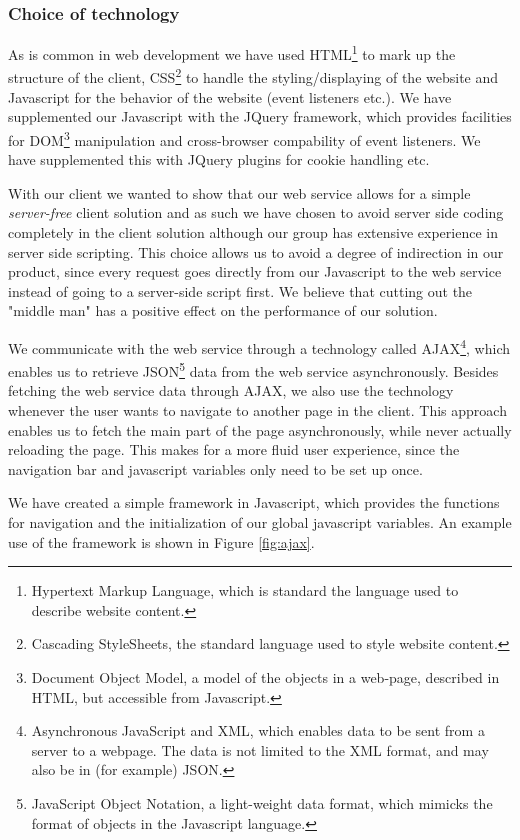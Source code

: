 \subsubsection{Choice of technology}

As is common in web development we have used HTML\footnote{Hypertext Markup Language,
which is standard the language used to describe website content.} to mark up the
structure of the client, CSS\footnote{Cascading StyleSheets, the standard language
used to style website content.} to handle the styling/displaying of the website and
Javascript for the behavior of the website (event listeners etc.). We have supplemented
our Javascript with the JQuery framework, which provides facilities for
DOM\footnote{Document Object Model, a model of the objects in a web-page, described in
HTML, but accessible from Javascript.} manipulation and cross-browser compability of
event listeners. We have supplemented this with JQuery plugins for cookie handling etc.

With our client we wanted to show that our web service allows for a simple \emph{server-free}
client solution and as such we have chosen to avoid server side coding completely in the
client solution although our group has extensive experience in server side scripting. This
choice allows us to avoid a degree of indirection in our product, since every request goes
directly from our Javascript to the web service instead of going to a server-side script
first. We believe that cutting out the "middle man" has a positive effect on the performance
of our solution.

We communicate with the web service through a technology called AJAX\footnote{Asynchronous
JavaScript and XML, which enables data to be sent from a server to a webpage. The data is
not limited to the XML format, and may also be in (for example) JSON.}, which enables us to
retrieve JSON\footnote{JavaScript Object Notation, a light-weight data format, which mimicks
the format of objects in the Javascript language.} data from the web service asynchronously.
Besides fetching the web service data through AJAX, we also use the technology whenever the
user wants to navigate to another page in the client. This approach enables us to fetch the
main part of the page asynchronously, while never actually reloading the page. This makes
for a more fluid user experience, since the navigation bar and javascript variables only
need to be set up once.

We have created a simple framework in Javascript, which provides the functions for navigation and the initialization of our global javascript variables. An example use of the framework is shown in Figure \ref{fig:ajax}.

